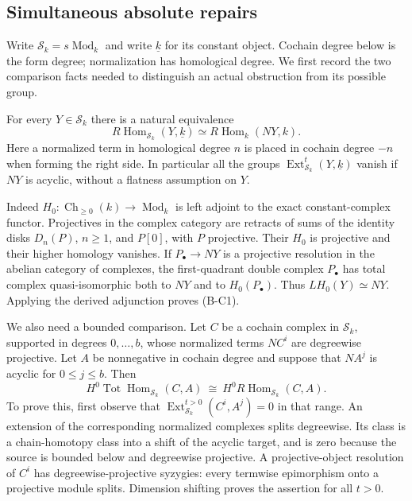 \subsection{Simultaneous absolute repairs}

Write $\mathcal S_k=s\operatorname{Mod}_k$ and write
$\underline{k}$ for its constant object. Cochain degree
below is the form degree; normalization has homological
degree. We first record the two comparison facts needed
to distinguish an actual obstruction from its possible
group.

For every $Y\in\mathcal S_k$ there is a natural equivalence
\begin{equation}
 R\operatorname{Hom}_{\mathcal S_k}(Y,\underline{k})
 \simeq R\operatorname{Hom}_k(NY,k).
 \tag{B-C1}
\end{equation}
Here a normalized term in homological degree $n$ is
placed in cochain degree $-n$ when forming the right
side. In particular all the groups
$\operatorname{Ext}^t_{\mathcal S_k}(Y,\underline{k})$
vanish if $NY$ is acyclic, without a flatness
assumption on $Y$.

Indeed $H_0:\operatorname{Ch}_{\geq0}(k)\to
\operatorname{Mod}_k$ is left adjoint to the exact
constant-complex functor. Projectives in the complex
category are retracts of sums of the identity disks
$D_n(P)$, $n\geq1$, and $P[0]$, with $P$ projective.
Their $H_0$ is projective and their higher homology
vanishes. If $P_\bullet\to NY$ is a projective
resolution in the abelian category of complexes, the
first-quadrant double complex $P_\bullet$ has total
complex quasi-isomorphic both to $NY$ and to
$H_0(P_\bullet)$. Thus $LH_0(Y)\simeq NY$.
Applying the derived adjunction proves (B-C1).

We also need a bounded comparison. Let $C$ be a
cochain complex in $\mathcal S_k$, supported in
degrees $0,\ldots,b$, whose normalized terms
$NC^i$ are degreewise projective. Let $A$ be
nonnegative in cochain degree and suppose that
$NA^j$ is acyclic for $0\leq j\leq b$.
Then
\begin{equation}
 H^0\operatorname{Tot}\operatorname{Hom}_{\mathcal S_k}(C,A)
 \ \cong\
 H^0R\operatorname{Hom}_{\mathcal S_k}(C,A).
 \tag{B-C2}
\end{equation}
To prove this, first observe that
$\operatorname{Ext}^{t>0}_{\mathcal S_k}(C^i,A^j)=0$
in that range. An extension of the corresponding
normalized complexes splits degreewise. Its class
is a chain-homotopy class into a shift of the
acyclic target, and is zero because the source is
bounded below and degreewise projective. A
projective-object resolution of $C^i$ has
degreewise-projective syzygies: every termwise
epimorphism onto a projective module splits.
Dimension shifting proves the assertion for all $t>0$.

